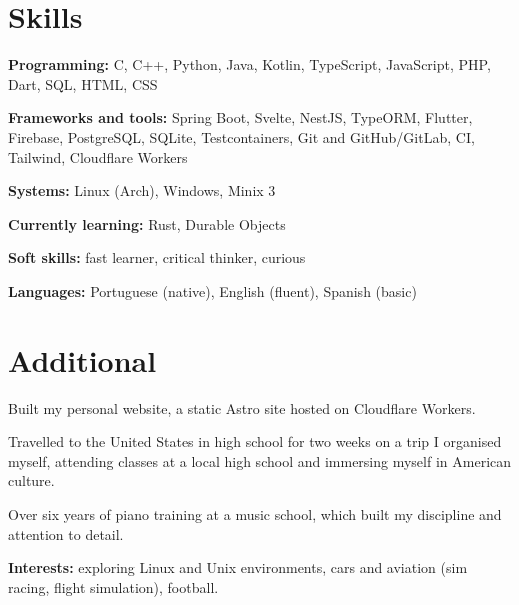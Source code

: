 \documentclass[11pt]{article}
\newcommand{\skill}[2]{\textbf{#1:} #2\par}
\begin{document}
\section{Skills}
\skill{Programming}{C, C++, Python, Java, Kotlin, TypeScript, JavaScript, PHP, Dart, SQL, HTML, CSS}
\skill{Frameworks and tools}{Spring Boot, Svelte, NestJS, TypeORM, Flutter, Firebase, PostgreSQL, SQLite,
  Testcontainers, Git and GitHub/GitLab, CI, Tailwind, Cloudflare Workers}
\skill{Systems}{Linux (Arch), Windows, Minix 3}
\skill{Currently learning}{Rust, Durable Objects}
\skill{Soft skills}{fast learner, critical thinker, curious}
\skill{Languages}{Portuguese (native), English (fluent), Spanish (basic)}

\section{Additional}
Built my personal website, a static Astro site hosted on Cloudflare Workers.

Travelled to the United States in high school for two weeks on a trip I organised myself, attending classes at a local high school and immersing myself in American culture.

Over six years of piano training at a music school, which built my discipline and attention to detail.

\skill{Interests}{exploring Linux and Unix environments, cars and aviation (sim racing, flight simulation), football.}
\end{document}
